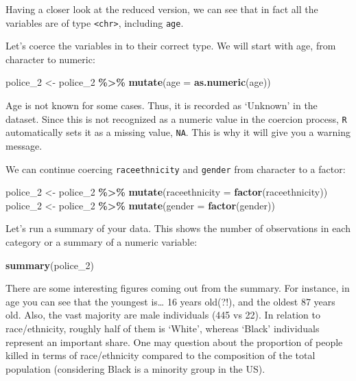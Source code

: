\documentclass[
]{book}
\newenvironment{Shaded}{\begin{snugshade}}{\end{snugshade}}
\newcommand{\AttributeTok}[1]{\textcolor[rgb]{0.13,0.29,0.53}{#1}}
\newcommand{\FunctionTok}[1]{\textcolor[rgb]{0.13,0.29,0.53}{\textbf{#1}}}
\newcommand{\NormalTok}[1]{#1}
\newcommand{\OtherTok}[1]{\textcolor[rgb]{0.56,0.35,0.01}{#1}}
\newcommand{\SpecialCharTok}[1]{\textcolor[rgb]{0.81,0.36,0.00}{\textbf{#1}}}
\begin{document}
Having a closer look at the reduced version, we can see that in fact all the variables are of type \texttt{\textless{}chr\textgreater{}}, including \texttt{age}.

Let's coerce the variables in to their correct type. We will start with age, from character to numeric:

\begin{Shaded}
\begin{Highlighting}[]
\NormalTok{police\_2 }\OtherTok{\textless{}{-}}\NormalTok{ police\_2 }\SpecialCharTok{\%\textgreater{}\%} \FunctionTok{mutate}\NormalTok{(}\AttributeTok{age =} \FunctionTok{as.numeric}\NormalTok{(age))}
\end{Highlighting}
\end{Shaded}

Age is not known for some cases. Thus, it is recorded as `Unknown' in the dataset. Since this is not recognized as a numeric value in the coercion process, \texttt{R} automatically sets it as a missing value, \texttt{NA}. This is why it will give you a warning message.

We can continue coercing \texttt{raceethnicity} and \texttt{gender} from character to a factor:

\begin{Shaded}
\begin{Highlighting}[]
\NormalTok{police\_2 }\OtherTok{\textless{}{-}}\NormalTok{ police\_2 }\SpecialCharTok{\%\textgreater{}\%} \FunctionTok{mutate}\NormalTok{(}\AttributeTok{raceethnicity =} \FunctionTok{factor}\NormalTok{(raceethnicity))}
\NormalTok{police\_2 }\OtherTok{\textless{}{-}}\NormalTok{ police\_2 }\SpecialCharTok{\%\textgreater{}\%} \FunctionTok{mutate}\NormalTok{(}\AttributeTok{gender =} \FunctionTok{factor}\NormalTok{(gender))}
\end{Highlighting}
\end{Shaded}

Let's run a summary of your data. This shows the number of observations in each category or a summary of a numeric variable:

\begin{Shaded}
\begin{Highlighting}[]
\FunctionTok{summary}\NormalTok{(police\_2)}
\end{Highlighting}
\end{Shaded}

There are some interesting figures coming out from the summary. For instance, in age you can see that the youngest is\ldots{} 16 years old(?!), and the oldest 87 years old. Also, the vast majority are male individuals (445 vs 22). In relation to race/ethnicity, roughly half of them is `White', whereas `Black' individuals represent an important share. One may question about the proportion of people killed in terms of race/ethnicity compared to the composition of the total population (considering Black is a minority group in the US).
\end{document}
